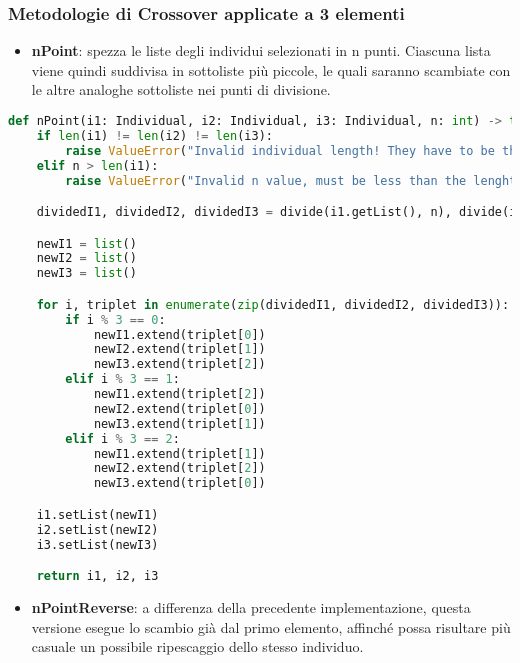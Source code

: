 \documentclass{article}
\begin{document}
\subsubsection {Metodologie di Crossover applicate a 3 elementi}

\begin{itemize}
\item\textbf{nPoint}: spezza le liste degli individui selezionati in n punti. Ciascuna lista viene quindi suddivisa in sottoliste più piccole, le quali saranno scambiate con le altre analoghe sottoliste nei punti di divisione.
\end{itemize}

\begin{lstlisting}[language=Python]
def nPoint(i1: Individual, i2: Individual, i3: Individual, n: int) -> tuple[Individual, Individual, Individual]:
    if len(i1) != len(i2) != len(i3):
        raise ValueError("Invalid individual length! They have to be the same.")
    elif n > len(i1):
        raise ValueError("Invalid n value, must be less than the lenght of the individual!")

    dividedI1, dividedI2, dividedI3 = divide(i1.getList(), n), divide(i2.getList(), n), divide(i3.getList(), n)

    newI1 = list()
    newI2 = list()
    newI3 = list()

    for i, triplet in enumerate(zip(dividedI1, dividedI2, dividedI3)):
        if i % 3 == 0:
            newI1.extend(triplet[0])
            newI2.extend(triplet[1])
            newI3.extend(triplet[2])
        elif i % 3 == 1:
            newI1.extend(triplet[2])
            newI2.extend(triplet[0])
            newI3.extend(triplet[1])
        elif i % 3 == 2:
            newI1.extend(triplet[1])
            newI2.extend(triplet[2])
            newI3.extend(triplet[0])

    i1.setList(newI1)
    i2.setList(newI2)
    i3.setList(newI3)

    return i1, i2, i3
\end{lstlisting}
\pagebreak

\begin{itemize}
\item\textbf{nPointReverse}: a differenza della precedente implementazione, questa versione esegue lo scambio già dal primo elemento, affinché possa risultare più casuale un possibile ripescaggio dello stesso individuo.
\end{itemize}
\end{document}

